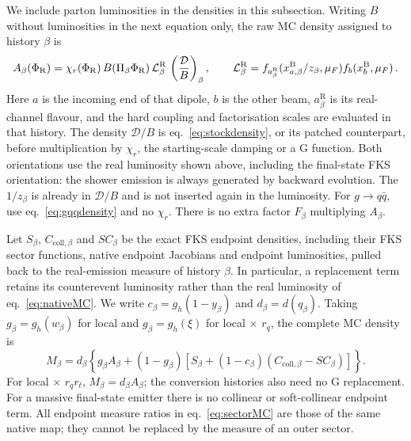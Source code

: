 \documentclass[a4paper,11pt]{article}
\newcommand{\Dens}{\mathcal{D}}
\newcommand{\PhiR}{\Phi_{\mathrm{R}}}
\newcommand{\loc}{local\xspace}
\newcommand{\locq}{local$\,{\times}\,r_q$\xspace}
\newcommand{\locqt}{local$\,{\times}\,r_qr_t$\xspace}
\begin{document}
We include parton luminosities in the densities in this subsection.
Writing $B$ without luminosities in the next equation only, the raw
MC density assigned to history $\beta$ is
\begin{equation}
 A_\beta(\PhiR)=\chi_r(\PhiR)\,
 B(\Pi_\beta\PhiR)\,
 {\cal L}^{\mathrm{R}}_\beta\,
 \left(\frac{\Dens}{B}\right)_\beta,
 \qquad
 {\cal L}^{\mathrm{R}}_\beta=
 f_{a_\beta^{\mathrm{R}}}(x_{a,\beta}^{\mathrm{B}}/z_\beta,\mu_F)
 f_b(x_b^{\mathrm{B}},\mu_F)\,.
 \label{eq:nativeMC}
\end{equation}
Here $a$ is the incoming end of that dipole, $b$ is the other beam,
$a_\beta^{\mathrm{R}}$ is its real-channel flavour, and the hard
coupling and factorisation scales are evaluated in that history.
The density $\Dens/B$ is eq.~\eqref{eq:stockdensity}, or its patched
counterpart, before multiplication by $\chi_r$, the starting-scale
damping or a G function. Both orientations use the real luminosity
shown above, including the final-state FKS orientation: the shower
emission is always generated by backward evolution. The $1/z_\beta$
is already in $\Dens/B$ and is not inserted again in the luminosity.
For $g\to q\bar q$, use eq.~\eqref{eq:gqqdensity} and no $\chi_r$.
There is no extra factor $F_\beta$ multiplying $A_\beta$.

Let $S_\beta$, $C_{\mathrm{coll},\beta}$ and $SC_\beta$ be the exact
FKS endpoint densities, including their FKS sector functions, native
endpoint Jacobians and endpoint luminosities, pulled back to the
real-emission measure of history $\beta$. In particular, a replacement
term retains its counterevent luminosity rather than the real
luminosity of eq.~\eqref{eq:nativeMC}. We write
$c_\beta=g_h(1-y_\beta)$ and $d_\beta=d(q_\beta)$. Taking
$g_\beta=g_h(w_\beta)$ for \loc and
$g_\beta=g_h(\xi)$ for \locq, the complete MC density is
\begin{equation}
 M_\beta=d_\beta\left\{
 g_\beta A_\beta+(1-g_\beta)
 \left[S_\beta+(1-c_\beta)
 (C_{\mathrm{coll},\beta}-SC_\beta)\right]\right\}.
 \label{eq:sectorMC}
\end{equation}
For \locqt, $M_\beta=d_\beta A_\beta$; the conversion histories also
need no G replacement. For a massive final-state emitter there is no
collinear or soft-collinear endpoint term. All endpoint measure
ratios in eq.~\eqref{eq:sectorMC} are those of the same native map;
they cannot be replaced by the measure of an outer sector.
\end{document}
